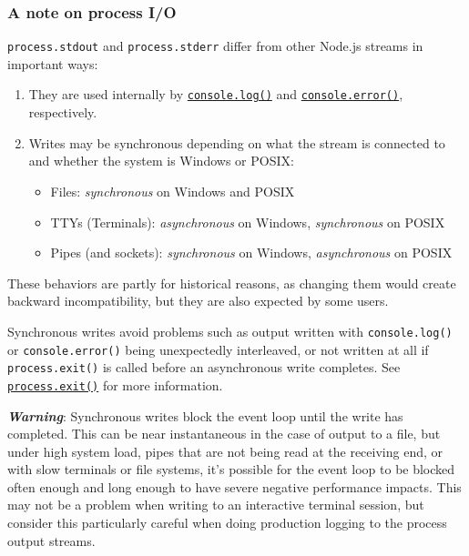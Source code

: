 \subsubsection{A note on process I/O}\label{a-note-on-process-io}

\texttt{process.stdout} and \texttt{process.stderr} differ from other
Node.js streams in important ways:

\begin{enumerate}
\def\labelenumi{\arabic{enumi}.}
\tightlist
\item
  They are used internally by
  \href{console.md\#consolelogdata-args}{\texttt{console.log()}} and
  \href{console.md\#consoleerrordata-args}{\texttt{console.error()}},
  respectively.
\item
  Writes may be synchronous depending on what the stream is connected to
  and whether the system is Windows or POSIX:

  \begin{itemize}
  \tightlist
  \item
    Files: \emph{synchronous} on Windows and POSIX
  \item
    TTYs (Terminals): \emph{asynchronous} on Windows, \emph{synchronous}
    on POSIX
  \item
    Pipes (and sockets): \emph{synchronous} on Windows,
    \emph{asynchronous} on POSIX
  \end{itemize}
\end{enumerate}

These behaviors are partly for historical reasons, as changing them
would create backward incompatibility, but they are also expected by
some users.

Synchronous writes avoid problems such as output written with
\texttt{console.log()} or \texttt{console.error()} being unexpectedly
interleaved, or not written at all if \texttt{process.exit()} is called
before an asynchronous write completes. See
\hyperref[processexitcode]{\texttt{process.exit()}} for more
information.

\emph{\textbf{Warning}}: Synchronous writes block the event loop until
the write has completed. This can be near instantaneous in the case of
output to a file, but under high system load, pipes that are not being
read at the receiving end, or with slow terminals or file systems, it's
possible for the event loop to be blocked often enough and long enough
to have severe negative performance impacts. This may not be a problem
when writing to an interactive terminal session, but consider this
particularly careful when doing production logging to the process output
streams.

